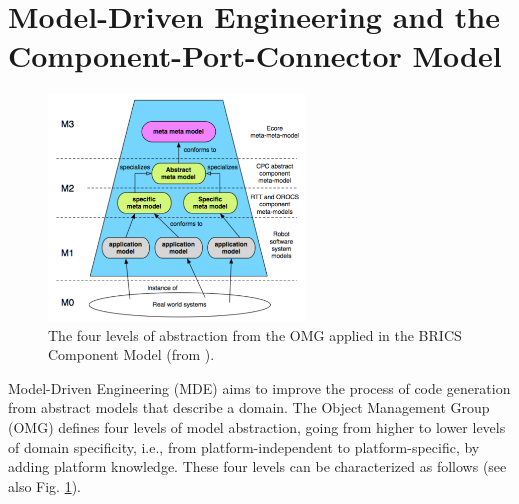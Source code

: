 \documentclass{CSSRforAfrica}
\begin{document}
\section{Model-Driven Engineering and the Component-Port-Connector Model}

\begin{figure}[t]
\begin{center}
\includegraphics[height=60mm,angle=0]{./figs/OMG.pdf}
\end{center}
\caption{The four levels of abstraction from the OMG \cite{OMG} applied in the BRICS Component Model (from \cite{Bruyninckxetal13}). }
\label{fig:OMG}       
\end{figure}

Model-Driven Engineering (MDE) aims to improve the process of code generation from abstract models that describe a domain.  The Object Management Group (OMG) \cite{OMG}  defines four levels of model abstraction, going from higher to lower levels of domain specificity, i.e., from platform-independent to platform-specific, by adding platform knowledge.  These four levels can be characterized as follows \cite{Bruyninckxetal13} (see also Fig. \ref{fig:OMG}).
\end{document}
